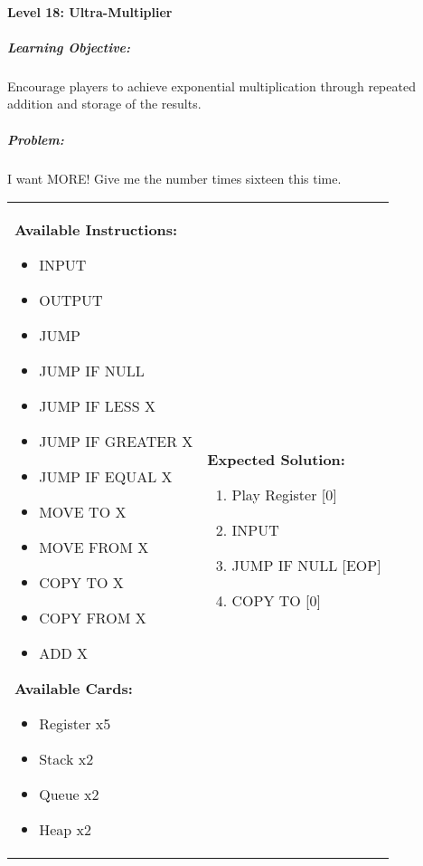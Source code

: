 \paragraph{Level 18: Ultra-Multiplier}
\subparagraph{Learning Objective:} Encourage players to achieve exponential multiplication through repeated addition and storage of the results.

\subparagraph{Problem:} I want MORE! Give me the number times sixteen this time.

\begin{center}
    \begin{tabular}{ | m{6cm} | m{8cm} | } 
        \hline
            \textbf{Available Instructions:} 
            \begin{itemize}
                \setlength\itemsep{-.35em}
                \item INPUT
                \item OUTPUT
                \item JUMP
                \item JUMP IF NULL
                \item JUMP IF LESS X
                \item JUMP IF GREATER X
		\item JUMP IF EQUAL X
                \item MOVE TO X
                \item MOVE FROM X
                \item COPY TO X
                \item COPY FROM X
		\item ADD X
            \end{itemize}
            \textbf{Available Cards:} 
            \begin{itemize}
                \setlength\itemsep{-.35em}
                \item Register x5
		\item Stack x2
                \item Queue x2
                \item Heap x2
            \end{itemize}& 
            \textbf{Expected Solution:} 
            \begin{enumerate}
                \setlength\itemsep{-.35em}
		\item Play Register [0]
                \item INPUT
		\item JUMP IF NULL [EOP]
		\item COPY TO [0]

\end{enumerate}
\end{tabular}
\end{center}
